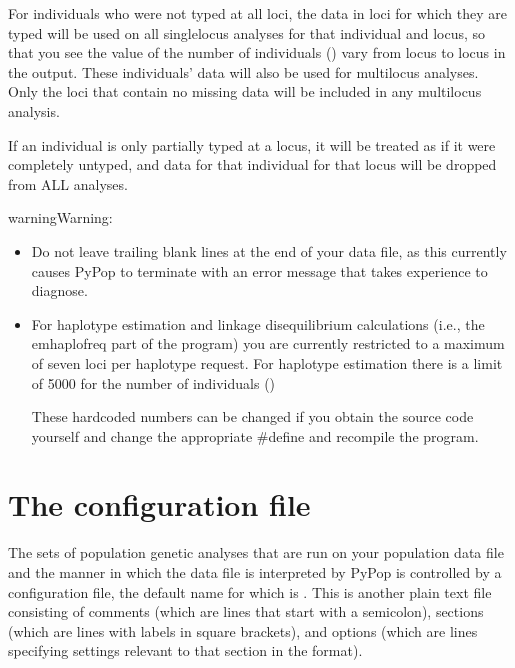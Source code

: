 \documentclass[letterpaper,10pt,english,openany,oneside]{sphinxmanual}
\begin{document}
\sphinxAtStartPar
For individuals who were not typed at all loci, the data in loci for
which they are typed will be used on all single\sphinxhyphen{}locus analyses for that
individual and locus, so that you see the value of the number of
individuals () vary from locus to locus in the output. These
individuals’ data will also be used for multi\sphinxhyphen{}locus analyses. Only the
loci that contain no missing data will be included in any multi\sphinxhyphen{}locus
analysis.

\sphinxAtStartPar
If an individual is only partially typed at a locus, it will be treated
as if it were completely untyped, and data for that individual for that
locus will be dropped from ALL analyses.

\begin{sphinxadmonition}{warning}{Warning:}\begin{itemize}
\item {} 
\sphinxAtStartPar
Do not leave trailing blank lines at the end of your data file, as
this currently causes PyPop to terminate with an error message
that takes experience to diagnose.

\item {} 
\sphinxAtStartPar
For haplotype estimation and linkage disequilibrium calculations
(i.e., the emhaplofreq part of the program) you are currently
restricted to a maximum of seven loci per haplotype request. For
haplotype estimation there is a limit of 5000 for the number of
individuals () %
\begin{footnote}[1]\sphinxAtStartFootnote
These hardcoded numbers can be changed if you obtain the source code
yourself and change the appropriate \#define  and
recompile the program.
%
\end{footnote}

\end{itemize}
\end{sphinxadmonition}


\section{The configuration file}
\label{\detokenize{docs/guide-chapter-usage:the-configuration-file}}\label{\detokenize{docs/guide-chapter-usage:guide-usage-configfile}}
\sphinxAtStartPar
The sets of population genetic analyses that are run on your population
data file and the manner in which the data file is interpreted by PyPop
is controlled by a configuration file, the default name for which is
. This is another plain text file consisting of comments
(which are lines that start with a semi\sphinxhyphen{}colon), sections (which are
lines with labels in square brackets), and options (which are lines
specifying settings relevant to that section in the 
format).
\end{document}
